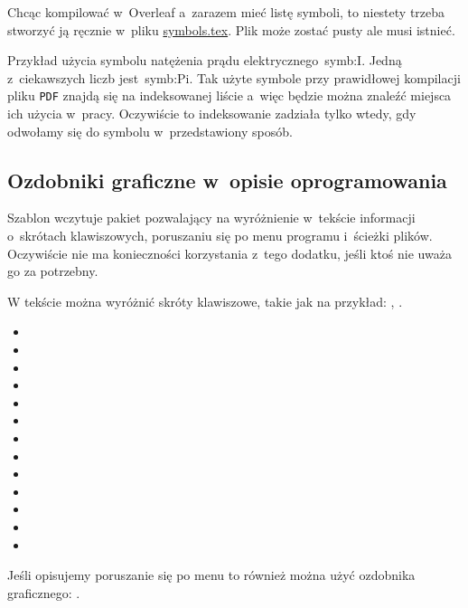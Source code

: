 Chcąc kompilować w~Overleaf a~zarazem mieć listę symboli, to niestety trzeba stworzyć ją ręcznie w~pliku \href{./symbols.tex}{symbols.tex}. Plik może zostać pusty ale musi istnieć.

Przykład użycia symbolu natężenia prądu elektrycznego~\gls{symb:I}. Jedną z~ciekawszych liczb jest~\gls{symb:Pi}. Tak użyte symbole przy prawidłowej kompilacji pliku \texttt{PDF} znajdą się na indeksowanej liście a~więc będzie można znaleźć miejsca ich użycia w~pracy. Oczywiście to indeksowanie zadziała tylko wtedy, gdy odwołamy się do symbolu w~przedstawiony sposób.

\subsection{Ozdobniki graficzne w~opisie oprogramowania}
Szablon wczytuje pakiet pozwalający na wyróżnienie w~tekście informacji o~skrótach klawiszowych, poruszaniu się po menu programu i~ścieżki plików. Oczywiście nie ma konieczności korzystania z~tego dodatku, jeśli ktoś nie uważa go za potrzebny.

W tekście można wyróżnić skróty klawiszowe, takie jak na przykład: , \keys{\ctrl, \Alt, \del}.
\begin{itemize}
    \item {}
    \item \keys{\Space} \keys{\SPACE}
    \item \keys{\backspace} \keys{\del} \keys{\backdel}
    \item \keys{\return} \keys{\enter}
    \item \keys{\shift} \keys{\capslock}
    \item \keys{\ctrl} \keys{\Alt} \keys{\AltGr}
    \item \keys{\tab}
    \item \keys{\esc} \keys{\oldesc}
    \item \keys{\winmenu}
    \item \keys{\arrowkey{^}} \keys{\arrowkeyup}
    \item {} \keys{\arrowkeydown}
    \item \keys{\arrowkey{>}} \keys{\arrowkeyright}
    \item \keys{\arrowkey{<}} \keys{\arrowkeyleft}
\end{itemize}

Jeśli opisujemy poruszanie się po menu to również można użyć ozdobnika graficznego: .

